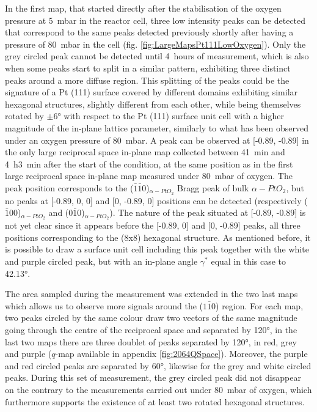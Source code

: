 In the first map, that started directly after the stabilisation of the oxygen pressure at \qty{5}{\milli\bar} in the reactor cell, three low intensity peaks can be detected that correspond to the same peaks detected previously shortly after having a pressure of \qty{80}{\milli\bar} in the cell (fig. \ref{fig:LargeMapsPt111LowOxygen}).
Only the grey circled peak cannot be detected until \qty{4}{hours} of measurement, which is also when some peaks start to split in a similar pattern, exhibiting three distinct peaks around a more diffuse region.
This splitting of the peaks could be the signature of a Pt (111) surface covered by different domains exhibiting similar hexagonal structures, slightly different from each other, while being themselves rotated by $\pm \ang{6}$ with respect to the Pt (111) surface unit cell with a higher magnitude of the in-plane lattice parameter, similarly to what has been observed under an oxygen pressure of \qty{80}{\milli\bar}.
A peak can be observed at [-0.89, -0.89] in the only large reciprocal space in-plane map collected between \qty{41}{\minute} and \qty{4}{\hour}\qty{3}{\minute} after the start of the condition, at the same position as in the first large reciprocal space in-plane map measured under \qty{80}{\milli\bar} of oxygen.
The peak position corresponds to the ($\bar{1}\bar{1}0$)$_{\alpha-PtO_2}$ Bragg peak of bulk $\alpha-PtO_2$, but no peaks at [-0.89, 0, 0] and [0, -0.89, 0] positions can be detected (respectively ($\bar{1}00$)$_{\alpha-PtO_2}$ and ($0\bar{1}0$)$_{\alpha-PtO_2}$).
The nature of the peak situated at [-0.89, -0.89] is not yet clear since it appears before the [-0.89, 0] and [0, -0.89] peaks, all three positions corresponding to the (8x8) hexagonal structure.
As mentioned before, it is possible to draw a surface unit cell including this peak together with the white and purple circled peak, but with an in-plane angle $\gamma^*$ equal in this case to \ang{42.13}.

The area sampled during the measurement was extended in the two last maps which allows us to observe more signals around the ($1\bar{1}0$) region.
For each map, two peaks circled by the same colour draw two vectors of the same magnitude going through the centre of the reciprocal space and separated by \ang{120}, in the last two maps there are three doublet of peaks separated by \ang{120}, in red, grey and purple ($q$-map available in appendix \ref{fig:2064QSpace}).
Moreover, the purple and red circled peaks are separated by \ang{60}, likewise for the grey and white circled peaks.
During this set of measurement, the grey circled peak did not disappear on the contrary to the measurements carried out under \qty{80}{\milli\bar} of oxygen, which furthermore supports the existence of at least two rotated hexagonal structures.

